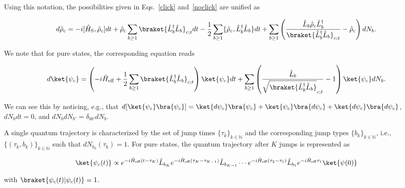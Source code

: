 \documentclass[preprint,pteplogo]{ptephy_v2}%
\numberwithin{equation}{section}
\theoremstyle{definition}
\newcommand{\mr}[1]{\mathrm{#1}}
\newcommand{\mbb}[1]{\mathbb{#1}}
\newcommand{\lrs}[1]{\left( #1 \right)}
\newcommand{\aln}[1]{
\begin{align}
#1
\end{align}
}
\begin{document}
Using this notation, the possibilities given in Eqs.~\eqref{click} and~\eqref{noclick} are unified as
\aln{\label{stochasticeq}
d\hat{\rho}_c=-i[\hat{H}_\mr{S},\hat{\rho}_c]dt+\hat{\rho}_c\sum_{b\geq 1}\braket{\hat{L}_b^\dag\hat{L}_b}_{c;t}dt-\frac{1}{2}\sum_{b\geq 1}\{\hat{\rho}_c,\hat{L}_b^\dag\hat{L}_b\}dt+\sum_{b\geq 1}\lrs{\frac{\hat{L}_b\hat{\rho}_c\hat{L}_b^\dag}{\braket{\hat{L}_b^\dag\hat{L}_b}_{c;t}}-\hat{\rho}_c}dN_b.
}
We note that for pure states, the corresponding equation reads
\aln{
d\ket{\psi_c}=\lrs{-i\hat{H}_\mr{eff}+\frac{1}{2}\sum_{b\geq 1}\braket{\hat{L}_b^\dag\hat{L}_b}_{c;t}}\ket{\psi_c}dt+\sum_{b\geq 1}\lrs{\frac{\hat{L}_b}{\sqrt{\braket{\hat{L}_b^\dag\hat{L}_b}}_{c;t}}-1}\ket{\psi_c}dN_b.
}
We can see this by noticing, e.g., that $d[\ket{\psi_c}\bra{\psi_c}]=\ket{d\psi_c}\bra{\psi_c}+\ket{\psi_c}\bra{d\psi_c}+\ket{d\psi_c}\bra{d\psi_c}$, $dN_bdt=0$, and $dN_bdN_{b'}=\delta_{bb'}dN_b$.

A single quantum trajectory is characterized by the set of jump times $\{\tau_k\}_{k\in\mbb{N}}$ and the corresponding jump types $\{b_k\}_{k\in\mbb{N}}$, i.e., $\{(\tau_k,b_k)\}_{k\in\mbb{N}}$ such that $dN_{b_k}(\tau_k)=1$.
For pure states, the quantum trajectory after $K$ jumps is represented as
\aln{\label{conttraj}
\ket{\psi_c(t)}\propto e^{-i\hat{H}_\mr{eff}(t-\tau_K)}\hat{L}_{b_K}
e^{-i\hat{H}_\mr{eff}(\tau_K-\tau_{K-1})}\hat{L}_{b_{K-1}}\cdots
e^{-i\hat{H}_\mr{eff}(\tau_2-\tau_{1})}\hat{L}_{b_{1}}e^{-i\hat{H}_\mr{eff}\tau_{1}}\ket{\psi(0)}
}
with $\braket{\psi_c(t)|\psi_c(t)}=1$.
\end{document}
